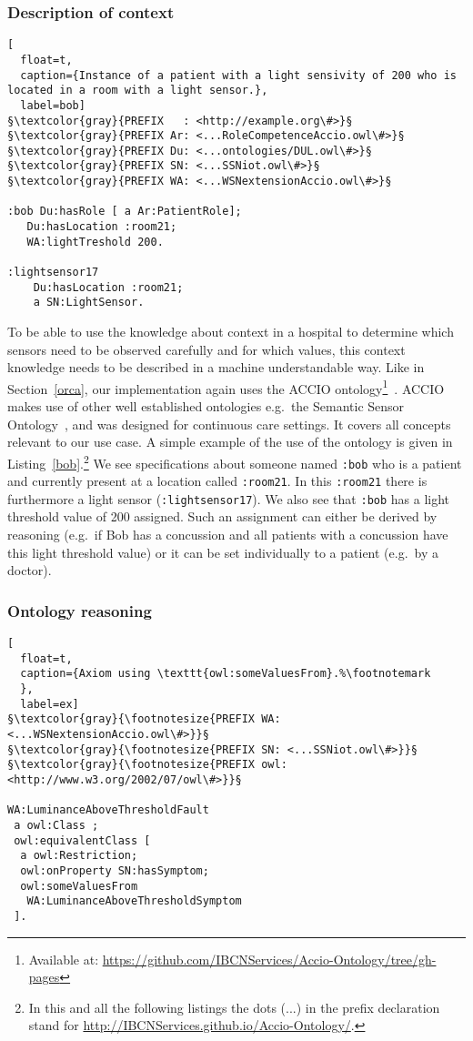 \subsubsection{Description of context}
\begin{lstlisting}[
  float=t,
  caption={Instance of a patient with a light sensivity of 200 who is located in a room with a light sensor.},
  label=bob]
§\textcolor{gray}{PREFIX   : <http://example.org\#>}§
§\textcolor{gray}{PREFIX Ar: <...RoleCompetenceAccio.owl\#>}§
§\textcolor{gray}{PREFIX Du: <...ontologies/DUL.owl\#>}§
§\textcolor{gray}{PREFIX SN: <...SSNiot.owl\#>}§
§\textcolor{gray}{PREFIX WA: <...WSNextensionAccio.owl\#>}§

:bob Du:hasRole [ a Ar:PatientRole];
   Du:hasLocation :room21;
   WA:lightTreshold 200.

:lightsensor17 
    Du:hasLocation :room21;
    a SN:LightSensor.
\end{lstlisting}
To be able to use the knowledge about context in a hospital to determine which sensors need to be observed carefully and for which values, this context knowledge needs 
to be described in a machine understandable way. Like in Section~\ref{orca}, our implementation again uses   
the ACCIO ontology\footnote{Available at: \url{https://github.com/IBCNServices/Accio-Ontology/tree/gh-pages}}~\cite{accioont}. 
ACCIO makes use of other well established ontologies e.g.\ the Semantic Sensor Ontology~\cite{ssn},
and was designed for %
continuous care settings. It covers all concepts relevant to our use case.
A simple example of the use of the ontology is given in Listing~\ref{bob}.\footnote{In this and all the following listings the dots (...)
  in the prefix declaration stand for \url{http://IBCNServices.github.io/Accio-Ontology/}.}
We see specifications about someone named \texttt{:bob} who is a patient and currently present at 
a location called \texttt{:room21}. 
In this \texttt{:room21} there is furthermore a light sensor (\texttt{:lightsensor17}).
We also see that \texttt{:bob} has
a light threshold value
of 200 assigned. Such an assignment can either be derived by reasoning (e.g.\ if 
Bob has a concussion and all patients with a concussion have this light threshold value) or it can be set individually to a patient (e.g.\ by a doctor).

\subsubsection{Ontology reasoning}
\begin{lstlisting}[
  float=t,
  caption={Axiom using \texttt{owl:someValuesFrom}.%\footnotemark
  },
  label=ex]  
§\textcolor{gray}{\footnotesize{PREFIX WA: <...WSNextensionAccio.owl\#>}}§
§\textcolor{gray}{\footnotesize{PREFIX SN: <...SSNiot.owl\#>}}§
§\textcolor{gray}{\footnotesize{PREFIX owl:<http://www.w3.org/2002/07/owl\#>}}§

WA:LuminanceAboveThresholdFault 
 a owl:Class ;
 owl:equivalentClass [ 
  a owl:Restriction;
  owl:onProperty SN:hasSymptom;
  owl:someValuesFrom 
   WA:LuminanceAboveThresholdSymptom 
 ].
\end{lstlisting}

